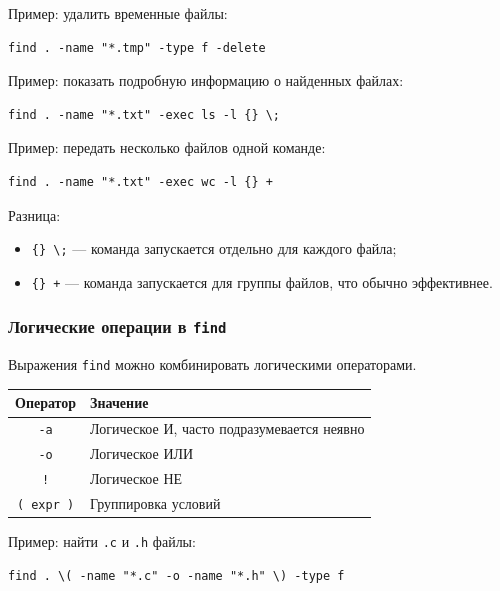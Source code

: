 \documentclass[12pt,a4paper]{article}
\begin{document}
Пример: удалить временные файлы:

\begin{verbatim}
find . -name "*.tmp" -type f -delete
\end{verbatim}

Пример: показать подробную информацию о найденных файлах:

\begin{verbatim}
find . -name "*.txt" -exec ls -l {} \;
\end{verbatim}

Пример: передать несколько файлов одной команде:

\begin{verbatim}
find . -name "*.txt" -exec wc -l {} +
\end{verbatim}

Разница:

\begin{itemize}
    \item \texttt{\{\} \textbackslash;} --- команда запускается отдельно для каждого файла;
    \item \texttt{\{\} +} --- команда запускается для группы файлов, что обычно эффективнее.
\end{itemize}

\subsubsection{Логические операции в \texttt{find}}

Выражения \texttt{find} можно комбинировать логическими операторами.

\begin{center}
\begin{tabular}{|c|p{9cm}|}
\hline
Оператор & Значение \\
\hline
\texttt{-a} & Логическое И, часто подразумевается неявно \\
\hline
\texttt{-o} & Логическое ИЛИ \\
\hline
\texttt{!} & Логическое НЕ \\
\hline
\texttt{( expr )} & Группировка условий \\
\hline
\end{tabular}
\end{center}

Пример: найти \texttt{.c} и \texttt{.h} файлы:

\begin{verbatim}
find . \( -name "*.c" -o -name "*.h" \) -type f
\end{verbatim}
\end{document}
